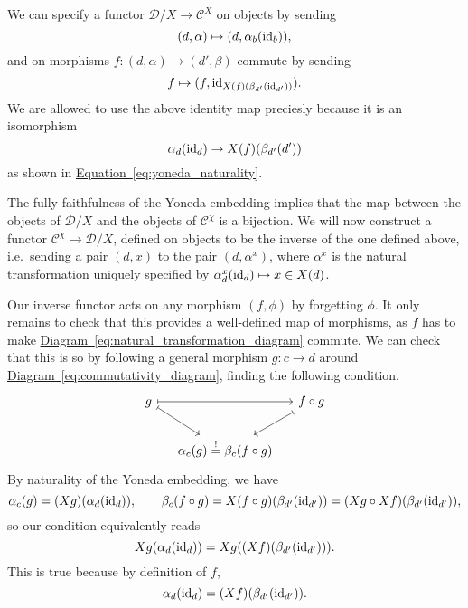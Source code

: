 \documentclass[main.tex]{subfiles}
\begin{document}
\begin{example}
  We can specify a functor $\mathcal{D}/X \to \mathcal{C}^{X}$ on objects by sending
  \begin{equation*}
    (d, \alpha) \mapsto (d, \alpha_{b}(\mathrm{id}_{b})),
  \end{equation*}
  and on morphisms $f\colon (d, \alpha) \to (d', \beta)$ commute by sending
  \begin{equation*}
    f \mapsto (f, \mathrm{id}_{X(f)(\beta_{d'}(\mathrm{id}_{d'}))}).
  \end{equation*}
  We are allowed to use the above identity map preciesly because it is an isomorphism
  \begin{equation*}
    \alpha_{d}(\mathrm{id}_{d}) \to X(f)(\beta_{d'}(d'))
  \end{equation*}
  as shown in \hyperref[eq:yoneda_naturality]{Equation~\ref*{eq:yoneda_naturality}}.

  The fully faithfulness of the Yoneda embedding implies that the map between the objects of $\mathcal{D}/X$ and the objects of $\mathcal{C}^{\chi}$ is a bijection. We will now construct a functor $\mathcal{C}^{\chi} \to \mathcal{D}/X$, defined on objects to be the inverse of the one defined above, i.e.\ sending a pair $(d, x)$ to the pair $(d, \alpha^{x})$, where $\alpha^{x}$ is the natural transformation uniquely specified by $\alpha^{x}_{d}(\mathrm{id}_{d}) \mapsto x \in X(d)$.

  Our inverse functor acts on any morphism $(f, \phi)$ by forgetting $\phi$. It only remains to check that this provides a well-defined map of morphisms, as $f$ has to make \hyperref[eq:natural_transformation_diagram]{Diagram~\ref*{eq:natural_transformation_diagram}} commute. We can check that this is so by following a general morphism $g\colon c \to d$ around \hyperref[eq:commutativity_diagram]{Diagram~\ref*{eq:commutativity_diagram}}, finding the following condition.
  \begin{equation*}
    \begin{tikzcd}[column sep=small]
      g
      \arrow[rr, mapsto]
      \arrow[rd, mapsto]
      && f \circ g
      \arrow[dl, mapsto]
      \\
      & \alpha_{c}(g) \overset{!}{=} \beta_{c}(f \circ g)
    \end{tikzcd}
  \end{equation*}
  By naturality of the Yoneda embedding, we have
  \begin{equation*}
    \alpha_{c}(g) = (Xg)(\alpha_{d}(\mathrm{id}_{d})),\qquad \beta_{c}(f \circ g) = X(f \circ g)(\beta_{d'}(\mathrm{id}_{d'})) = (Xg \circ Xf)(\beta_{d'}(\mathrm{id}_{d'})),
  \end{equation*}
  so our condition equivalently reads
  \begin{equation*}
    Xg(\alpha_{d}(\mathrm{id}_{d})) = Xg((Xf)(\beta_{d'}(\mathrm{id}_{d'}))).
  \end{equation*}
  This is true because by definition of $f$,
  \begin{equation*}
    \alpha_{d}(\mathrm{id}_{d}) = (Xf)(\beta_{d'}(\mathrm{id}_{d'})).
  \end{equation*}


\end{example}
\end{document}
